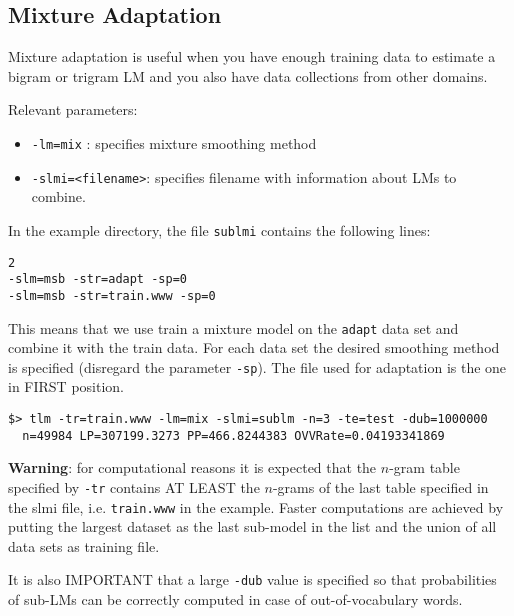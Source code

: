 \subsection{Mixture Adaptation}

\noindent
Mixture adaptation  is useful  when you have  enough training  data to
estimate a  bigram or  trigram LM and  you also have  data collections
from other domains.

\noindent
Relevant parameters:
\begin{itemize}
\item {\tt-lm=mix} : specifies mixture smoothing method
\item {\tt -slmi=<filename>}: specifies filename with information about LMs to combine.
\end{itemize}

\noindent
In the example directory, the file {\tt sublmi} contains the following lines:
\begin{verbatim}
2
-slm=msb -str=adapt -sp=0
-slm=msb -str=train.www -sp=0
\end{verbatim}

\noindent
This means  that we use train a  mixture model on the  {\tt adapt} data set and
combine it  with the train data. For each data  set the desired
smoothing method is specified  (disregard the parameter {\tt -sp}). The file
used for adaptation is the one in FIRST position.

\begin{verbatim}
$> tlm -tr=train.www -lm=mix -slmi=sublm -n=3 -te=test -dub=1000000
  n=49984 LP=307199.3273 PP=466.8244383 OVVRate=0.04193341869
\end{verbatim}

\noindent
{\bf Warning}: for  computational reasons it  is expected that  the $n$-gram
table  specified by {\tt -tr}  contains AT  LEAST the  $n$-grams of  the last
table specified in the slmi file, i.e. {\tt train.www} in  the example.
Faster computations are achieved by putting the largest dataset as the
last sub-model in the list and the union of all data sets as training
file.

\noindent
It is  also IMPORTANT  that a  large {\tt -dub} value  is specified  so that
probabilities  of  sub-LMs  can  be  correctly  computed  in  case  of
out-of-vocabulary words.

